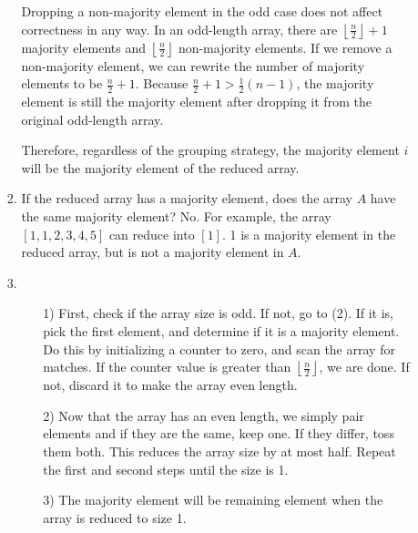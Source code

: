 \documentclass{article}
\begin{document}
\begin{enumerate}
\begin{enumerate}
\begin{enumerate}
                        \hfill \break
                        Dropping a non-majority element in the odd case does not affect correctness in any
                        way. In an odd-length array, there are $\left\lfloor\frac{n}{2}\right\rfloor + 1$ 
                        majority elements and $\left\lfloor\frac{n}{2}\right\rfloor$ non-majority elements.
                        If we remove a non-majority element, we can rewrite the 
                        number of majority elements to be $\frac{n}{2} + 1$. Because $\frac{n}{2} + 1 >
                        \frac{1}{2}\left(n - 1\right)$, the majority element is still the majority
                        element after dropping it from the original odd-length array.
                        
                        \hfill \break
                        Therefore, regardless of the grouping strategy, the majority element $i$ 
                        will be the majority element of the reduced array.
                        
                    \item If the reduced array has a majority element, does the array $A$ have the 
                        same majority element? No. For example, the array $\left[1, 1, 2, 3, 4, 5\right]$ can reduce into $\left[1\right]$. 1 is a majority element in the reduced
                        array, but is not a majority element in $A$.
                        
                    \item 
                        \begin{enumerate}
                            \item[1)] First, check if the array size is odd. If not, go to (2).
                                If it is, pick the first element, and determine if it is a majority element. 
                                Do this by initializing a counter to zero, and scan the array for matches. 
                                If the counter value is greater  than $\left\lfloor\frac{n}{2}\right\rfloor$, 
                                we are done. If not, discard it to make the array even length.
                            \item[2)] Now that the array has an even length, we simply pair elements and
                                if they are the same, keep one. If they differ, toss them both. This
                                reduces the array size by at most half. Repeat the first and second steps
                                until the size is 1.
                            \item[3)] The majority element will be remaining element when the array
                                is reduced to size 1.
                        \end{enumerate}
                        

\end{enumerate}
\end{enumerate}
\end{enumerate}
\end{document}
